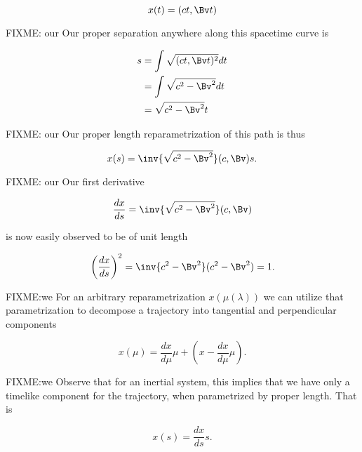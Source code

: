 \begin{equation}\label{eqn:grahamSchmidtLorentz:440}
x(t) = (c t, \Bv t)
\end{equation}

FIXME: our
Our proper separation anywhere along this spacetime curve is

\begin{equation}\label{eqn:grahamSchmidtLorentz:460}
\begin{aligned}
s
&= \int \sqrt{(c t, \Bv t)^2} dt  \\
&= \int \sqrt{ c^2 - \Bv^2 } dt  \\
&= \sqrt{ c^2 - \Bv^2 } t
\end{aligned}
\end{equation}

FIXME: our
Our proper length reparametrization of this path is thus

\begin{equation}\label{eqn:grahamSchmidtLorentz:480}
x(s) = \inv{\sqrt{c^2 - \Bv^2}} (c, \Bv) s.
\end{equation}

FIXME: our
Our first derivative

\begin{equation}\label{eqn:grahamSchmidtLorentz:500}
\frac{dx}{ds} = \inv{\sqrt{c^2 - \Bv^2}} (c, \Bv)
\end{equation}

is now easily observed to be of unit length

\begin{equation}\label{eqn:grahamSchmidtLorentz:520}
\left( \frac{dx}{ds} \right)^2 = \inv{c^2 - \Bv^2} (c^2 - \Bv^2) = 1.
\end{equation}

FIXME:we
For an arbitrary reparametrization $x(\mu(\lambda))$ we can utilize that parametrization to decompose a trajectory into tangential and perpendicular components

\begin{equation}\label{eqn:grahamSchmidtLorentz:540}
x(\mu) = \frac{dx}{d\mu} \mu + \left( x - \frac{dx}{d\mu} \mu \right).
\end{equation}

FIXME:we
Observe that for an inertial system, this implies that we have only a timelike component for the trajectory, when parametrized by proper length.  That is

\begin{equation}\label{eqn:grahamSchmidtLorentz:580}
x(s) = \frac{dx}{ds} s.
\end{equation}

